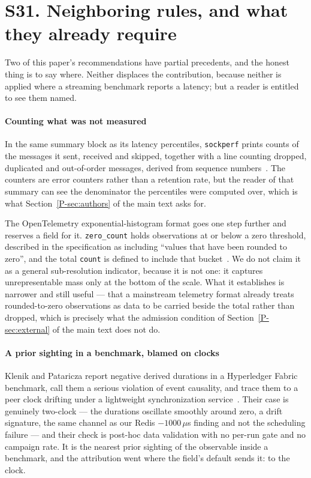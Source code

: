 \documentclass[10pt,journal,onecolumn]{IEEEtran}
\newcommand{\mainModeB}{\ref{P-sec:external}}              %
\newcommand{\mainAuthors}{\ref{P-sec:authors}}        %
\begin{document}
\section{S31. Neighboring rules, and what they already require}
\label{sec:neighbors}

Two of this paper's recommendations have partial precedents, and the honest thing is to say
where. Neither displaces the contribution, because neither is applied where a streaming
benchmark reports a latency; but a reader is entitled to see them named.

\paragraph{Counting what was not measured}
In the same summary block as its latency percentiles, \texttt{sockperf} prints counts of the
messages it sent, received and skipped, together with a
line counting dropped, duplicated and out-of-order messages, derived from sequence
numbers~\cite{sockperf}. The
counters are error counters rather than a retention rate, but the reader of that summary can
see the denominator the percentiles were computed over, which is what
Section~\mainAuthors{} of the main text asks for.

The OpenTelemetry exponential-histogram format goes one step further and reserves a field for
it. \texttt{zero\_count} holds observations at or below a zero threshold, described in the
specification as including ``values that have been rounded to zero'', and the total
\texttt{count} is defined to include that bucket~\cite{otlp_exphisto}. We do not claim it as a
general sub-resolution indicator, because it is not one: it captures unrepresentable mass only
at the bottom of the scale. What it establishes is narrower and still useful --- that a
mainstream telemetry format already treats rounded-to-zero observations as data to be carried
beside the total rather than dropped, which is precisely what the admission condition of
Section~\mainModeB{} of the main text does not do.

\paragraph{A prior sighting in a benchmark, blamed on clocks} Klenik and Pataricza report
negative derived durations in a Hyperledger Fabric benchmark, call them a serious violation
of event causality, and trace them to a peer clock drifting under a lightweight
synchronization service~\cite{klenik2021}. Their case is genuinely two-clock --- the
durations oscillate smoothly around zero, a drift signature, the same channel as our Redis
$-1000\,\mu$s finding and not the scheduling failure --- and their check is post-hoc data validation with no
per-run gate and no campaign rate. It is the nearest prior sighting of the observable inside
a benchmark, and the attribution went where the field's default sends it: to the clock.
\end{document}
